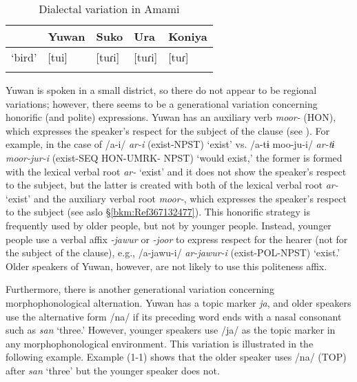 \begin{table}
\caption{Dialectal variation in Amami\label{tab:key:1}}
\begin{tabular}{lllll} 
\lsptoprule
       & Yuwan & Suko & Ura & Koniya\\\midrule
‘bird’ & [tui] & [tuɾi] &  [tuɾi] &  [tuɾ]\\
\lspbottomrule
\end{tabular}
\end{table}

Yuwan is spoken in a small district, so there do not appear to be regional variations; however, there seems to be a generational variation concerning honorific (and polite) expressions. Yuwan has an auxiliary verb \textit{moor-} (HON), which expresses the speaker’s respect for the subject of the clause (see ). For example, in the case of /a-i/ \textit{ar-i} (exist-NPST) ‘exist’ vs. /a-tɨ moo-ju-i/ \textit{ar-tɨ} \textit{moor-jur-i} (exist-SEQ HON-UMRK- NPST) ‘would exist,’ the former is formed with the lexical verbal root \textit{ar-} ‘exist’ and it does not show the speaker’s respect to the subject, but the latter is created with both of the lexical verbal root \textit{ar-} ‘exist’ and the auxiliary verbal root \textit{moor-}, which expresses the speaker’s respect to the subject (see aslo §\ref{bkm:Ref367132477}). This honorific strategy is frequently used by older people, but not by younger people. Instead, younger people use a verbal affix \textit{{}-jawur} or \textit{{}-joor} to express respect for the hearer (not for the subject of the clause), e.g., /a-jawu-i/ \textit{ar-jawur-i} (exist-POL-NPST) ‘exist.’ Older speakers of Yuwan, however, are not likely to use this politeness affix.

Furthermore, there is another generational variation concerning morphophonological alternation. Yuwan has a topic marker \textit{ja}, and older speakers use the alternative form /na/ if its preceding word ends with a nasal consonant such as \textit{san} ‘three.’ However, younger speakers use /ja/ as the topic marker in any morphophonological environment. This variation is illustrated in the following example. Example (1-1) shows that the older speaker uses /na/ (TOP) after \textit{san} ‘three’ but the younger speaker does not.

